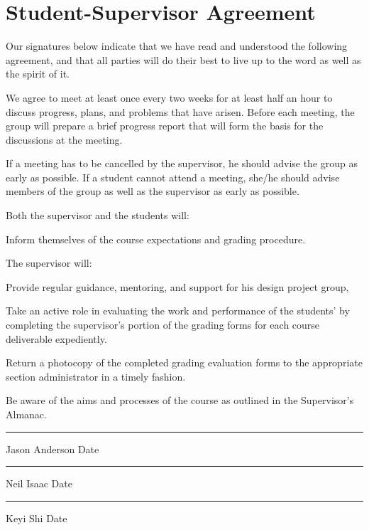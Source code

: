 \section{Student-Supervisor Agreement}

\small{

Our signatures below indicate that we have read and understood the following agreement, and that all parties will do their best to live up to the word as well as the spirit of it.

We agree to meet at least once every two weeks for at least half an hour to discuss progress, plans, and problems that have arisen.
Before each meeting, the group will prepare a brief progress report that will form the basis for the discussions at the meeting.

If a meeting has to be cancelled by the supervisor, he should advise the group as early as possible.
If a student cannot attend a meeting, she/he should advise members of the group as well as the supervisor as early as possible.

Both the supervisor and the students will:
\begin{itemlist}
	\item Inform themselves of the course expectations and grading procedure.
\end{itemlist}

The supervisor will:
\begin{itemlist}
	\item Provide regular guidance, mentoring, and support for his design project group,
	\item Take an active role in evaluating the work and performance of the students' by completing the supervisor's portion of the grading forms for each course deliverable expediently.
	\item Return a photocopy of the completed grading evaluation forms to the appropriate section administrator in a timely fashion.
	\item Be aware of the aims and processes of the course as outlined in the Supervisor's Almanac.
\end{itemlist}


\vfill \hrule Jason Anderson \hfill Date \hspace{1.5in}
\vfill \hrule Neil Isaac \hfill Date \hspace{1.5in}
\vfill \hrule Keyi Shi \hfill Date \hspace{1.5in}

}

